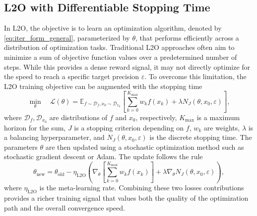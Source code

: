 \documentclass{article}
\newcommand{\E}{\mathbb{E}}
\begin{document}
\subsection{L2O with Differentiable Stopping Time}
\label{sec:l2o_application}
In L2O, the objective is to learn an optimization algorithm, denoted by \eqref{eq:iter_form_general}, parameterized by $\theta$, that performs efficiently across a distribution of optimization tasks. Traditional L2O approaches often aim to minimize a sum of objective function values over a predetermined number of steps. While this provides a dense reward signal, it may not directly optimize for the speed to reach a specific target precision $\varepsilon$. To overcome this limitation, the L2O training objective can be augmented with the stopping time
\begin{equation}
\label{eq:l2o_objective}
    \min_{\theta} \quad \mathcal{L}(\theta) = \E_{f \sim \mathcal{D}_f, x_0 \sim \mathcal{D}_{x_0}} \left[ \sum_{k=0}^{K_{\text{max}}} w_k f(x_k) + \lambda N_J(\theta, x_0, \varepsilon) \right],
\end{equation}
where $\mathcal{D}_f,\mathcal{D}_{x_0}$ are distributions of $f$ and $x_0$, respectively, $K_{\text{max}}$ is a maximum horizon for the sum, $J$ is a stopping criterion depending on $f$, $w_k$ are weights, $\lambda$ is a balancing hyperparameter, and $N_J(\theta, x_0, \varepsilon)$ is the discrete stopping time. The parameters $\theta$ are then updated using a stochastic optimization method such as stochastic gradient descent or Adam. The update follows the rule
\begin{equation}
\theta_{\text{new}} = \theta_{\text{old}} - \eta_{\text{L2O}} \left( \nabla_{\theta} \left[\sum_{k=0}^{K_{\text{max}}} w_k f(x_k)\right] + \lambda \nabla_{\theta} N_J(\theta, x_0, \varepsilon) \right),
\end{equation}
where $\eta_{\text{L2O}}$ is the meta-learning rate. Combining these two losses contributions provides a richer training signal that values both the quality of the optimization path and the overall convergence speed.
\end{document}
